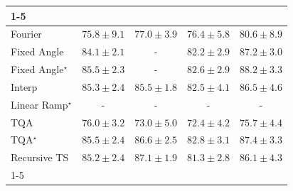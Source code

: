 \begin{tabular}{l|cccc|}
\cline{1-5}
\multicolumn{5}{c}{\rule{0pt}{8pt}SV} \\
\midrule
Fourier & {\cellcolor[HTML]{97B7D7}} \color[HTML]{000000} $75.8\pm 9.1$ & {\cellcolor[HTML]{80AED2}} \color[HTML]{F1F1F1} $77.0\pm 3.9$ & {\cellcolor[HTML]{8CB3D5}} \color[HTML]{000000} $76.4\pm 5.8$ & {\cellcolor[HTML]{308CBE}} \color[HTML]{F1F1F1} $80.6\pm 8.9$ \\
Fixed Angle & {\cellcolor[HTML]{0566A0}} \color[HTML]{F1F1F1} $84.1\pm 2.1$ & {\cellcolor[HTML]{000000}} \color[HTML]{F1F1F1} {\cellcolor{white}} \color{black} - & {\cellcolor[HTML]{1278B4}} \color[HTML]{F1F1F1} $82.2\pm 2.9$ & {\cellcolor[HTML]{03456C}} \color[HTML]{F1F1F1} $87.2\pm 3.0$ \\
Fixed Angle$^\star$ & {\cellcolor[HTML]{045A8D}} \color[HTML]{F1F1F1} $85.5\pm 2.3$ & {\cellcolor[HTML]{000000}} \color[HTML]{F1F1F1} {\cellcolor{white}} \color{black} - & {\cellcolor[HTML]{0A73B2}} \color[HTML]{F1F1F1} $82.6\pm 2.9$ & {\cellcolor[HTML]{023858}} \color[HTML]{F1F1F1} $88.2\pm 3.3$ \\
Interp & {\cellcolor[HTML]{045C90}} \color[HTML]{F1F1F1} $85.3\pm 2.4$ & {\cellcolor[HTML]{045A8D}} \color[HTML]{F1F1F1} $85.5\pm 1.8$ & {\cellcolor[HTML]{0D75B3}} \color[HTML]{F1F1F1} $82.5\pm 4.1$ & {\cellcolor[HTML]{034D79}} \color[HTML]{F1F1F1} $86.5\pm 4.6$ \\
Linear Ramp$^\star$ & {\cellcolor[HTML]{000000}} \color[HTML]{F1F1F1} {\cellcolor{white}} \color{black} - & {\cellcolor[HTML]{000000}} \color[HTML]{F1F1F1} {\cellcolor{white}} \color{black} - & {\cellcolor[HTML]{000000}} \color[HTML]{F1F1F1} {\cellcolor{white}} \color{black} - & {\cellcolor[HTML]{000000}} \color[HTML]{F1F1F1} {\cellcolor{white}} \color{black} - \\
TQA & {\cellcolor[HTML]{94B6D7}} \color[HTML]{000000} $76.0\pm 3.2$ & {\cellcolor[HTML]{C6CCE3}} \color[HTML]{000000} $73.0\pm 5.0$ & {\cellcolor[HTML]{D0D1E6}} \color[HTML]{000000} $72.4\pm 4.2$ & {\cellcolor[HTML]{99B8D8}} \color[HTML]{000000} $75.7\pm 4.4$ \\
TQA$^\star$ & {\cellcolor[HTML]{045A8D}} \color[HTML]{F1F1F1} $85.5\pm 2.4$ & {\cellcolor[HTML]{034C78}} \color[HTML]{F1F1F1} $86.6\pm 2.5$ & {\cellcolor[HTML]{0771B1}} \color[HTML]{F1F1F1} $82.8\pm 3.1$ & {\cellcolor[HTML]{034267}} \color[HTML]{F1F1F1} $87.4\pm 3.3$ \\
Recursive TS & {\cellcolor[HTML]{045D92}} \color[HTML]{F1F1F1} $85.2\pm 2.4$ & {\cellcolor[HTML]{03466E}} \color[HTML]{F1F1F1} $87.1\pm 1.9$ & {\cellcolor[HTML]{2383BA}} \color[HTML]{F1F1F1} $81.3\pm 2.8$ & {\cellcolor[HTML]{045382}} \color[HTML]{F1F1F1} $86.1\pm 4.3$ \\
\cline{1-5}
\bottomrule
\end{tabular}
